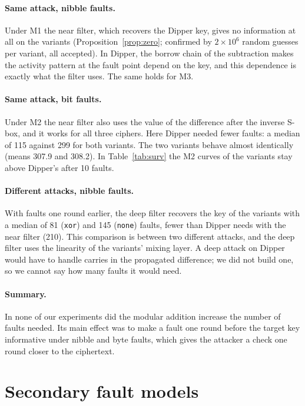 \documentclass[pdflatex,sn-mathphys-num]{sn-jnl}
\theoremstyle{thmstyleone}%
\theoremstyle{thmstylethree}%
\begin{document}
\paragraph{Same attack, nibble faults.} Under M1 the near filter, which recovers the Dipper key, gives no
information at all on the variants (Proposition~\ref{prop:zero}; confirmed by $2\times10^{6}$ random guesses
per variant, all accepted). In Dipper, the borrow chain of the subtraction makes the activity pattern at the
fault point depend on the key, and this dependence is exactly what the filter uses. The same holds for M3.

\paragraph{Same attack, bit faults.} Under M2 the near filter also uses the value of the difference after
the inverse S-box, and it works for all three ciphers. Here Dipper needed fewer faults: a median of 115
against 299 for both variants. The two variants behave almost identically (means 307.9 and 308.2). In
Table~\ref{tab:surv} the M2 curves of the variants stay above Dipper's after 10 faults.

\paragraph{Different attacks, nibble faults.} With faults one round earlier, the deep filter recovers the
key of the variants with a median of 81 (\texttt{xor}) and 145 (\texttt{none}) faults, fewer than Dipper
needs with the near filter (210). This comparison is between two different attacks, and the deep filter
uses the linearity of the variants' mixing layer. A deep attack on Dipper would have to handle carries in
the propagated difference; we did not build one, so we cannot say how many faults it would need.

\paragraph{Summary.} In none of our experiments did the modular addition increase the number of faults
needed. Its main effect was to make a fault one round before the target key informative under nibble and
byte faults, which gives the attacker a check one round closer to the ciphertext.

\section{Secondary fault models}\label{sec:secondary}
\end{document}
